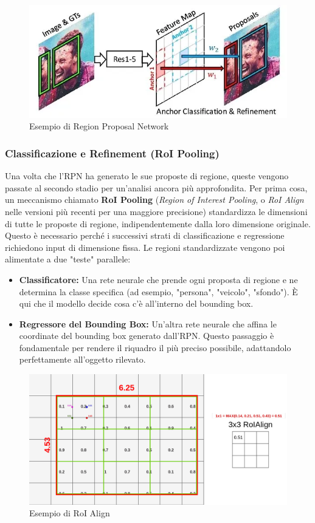 \documentclass[12pt]{article}
\begin{document}
\begin{figure}[H]
    \centering
    \includegraphics[width=1.00\textwidth]{./img/rpn-example.png}
    \caption{Esempio di Region Proposal Network}
    \label{fig:rpn-example}
\end{figure}


\subsubsection{Classificazione e Refinement (RoI Pooling)}
Una volta che l'RPN ha generato le sue proposte di regione, queste vengono passate al secondo stadio per un'analisi ancora più approfondita. Per prima cosa, un meccanismo chiamato \textbf{RoI Pooling} (\textit{Region of Interest Pooling}, o \textit{RoI Align} nelle versioni più recenti per una maggiore precisione) standardizza le dimensioni di tutte le proposte di regione, indipendentemente dalla loro dimensione originale. Questo è necessario perché i successivi strati di classificazione e regressione richiedono input di dimensione fissa.
Le regioni standardizzate vengono poi alimentate a due "teste" parallele:
\begin{itemize}
\item \textbf{Classificatore:} Una rete neurale che prende ogni proposta di regione e ne determina la classe specifica (ad esempio, "persona", "veicolo", "sfondo"). È qui che il modello decide cosa c'è all'interno del bounding box.
\item \textbf{Regressore del Bounding Box:} Un'altra rete neurale che affina le coordinate del bounding box generato dall'RPN. Questo passaggio è fondamentale per rendere il riquadro il più preciso possibile, adattandolo perfettamente all'oggetto rilevato.
\end{itemize} 

\begin{figure}[H]
    \centering
    \includegraphics[width=1.00\textwidth]{./img/roi-align-img.png}
    \caption{Esempio di RoI Align}
    \label{fig:roi-example}
\end{figure}
\end{document}
